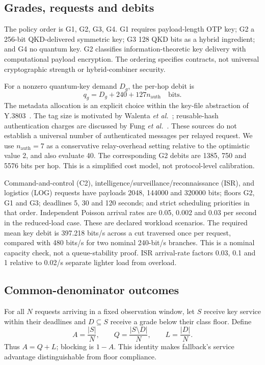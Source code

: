 \documentclass[conference,a4paper]{IEEEtran}
\begin{document}
\subsection{Grades, requests and debits}
The policy order is G1, G2, G3, G4. G1 requires payload-length OTP key; G2 a 256-bit QKD-delivered symmetric key; G3 128 QKD bits as a hybrid ingredient; and G4 no quantum key. G2 classifies information-theoretic key delivery with computational payload encryption. The ordering specifies contracts, not universal cryptographic strength or hybrid-combiner security.

For a nonzero quantum-key demand $D_g$, the per-hop debit is
\begin{equation}\label{eq:debit}
q_g=D_g+240+127n_{\mathrm{auth}}\quad\text{bits}.
\end{equation}
The metadata allocation is an explicit choice within the key-file abstraction of Y.3803~\cite{itu}. The tag size is motivated by Walenta \emph{et al.}~\cite{walenta}; reusable-hash authentication charges are discussed by Fung \emph{et al.}~\cite{fung}. These sources do not establish a universal number of authenticated messages per relayed request. We use $n_{\mathrm{auth}}=7$ as a conservative relay-overhead setting relative to the optimistic value 2, and also evaluate 40. The corresponding G2 debits are 1385, 750 and 5576 bits per hop. This is a simplified cost model, not protocol-level calibration.

Command-and-control (C2), intelligence/surveillance/reconnaissance (ISR), and logistics (LOG) requests have payloads 2048, 144000 and 320000 bits; floors G2, G1 and G3; deadlines 5, 30 and 120 seconds; and strict scheduling priorities in that order. Independent Poisson arrival rates are 0.05, 0.002 and 0.03 per second in the reduced-load case. These are declared workload scenarios. The required mean key debit is 397.218 bits/s across a cut traversed once per request, compared with 480 bits/s for two nominal 240-bit/s branches. This is a nominal capacity check, not a queue-stability proof. ISR arrival-rate factors 0.03, 0.1 and 1 relative to 0.02/s separate lighter load from overload.

\subsection{Common-denominator outcomes}\label{sec:metrics}
For all $N$ requests arriving in a fixed observation window, let $S$ receive key service within their deadlines and $D\subseteq S$ receive a grade below their class floor. Define
\begin{equation}\label{eq:metrics}
A=\frac{|S|}{N},\qquad Q=\frac{|S\setminus D|}{N},\qquad L=\frac{|D|}{N}.
\end{equation}
Thus $A=Q+L$; blocking is $1-A$. This identity makes fallback's service advantage distinguishable from floor compliance.
\end{document}
